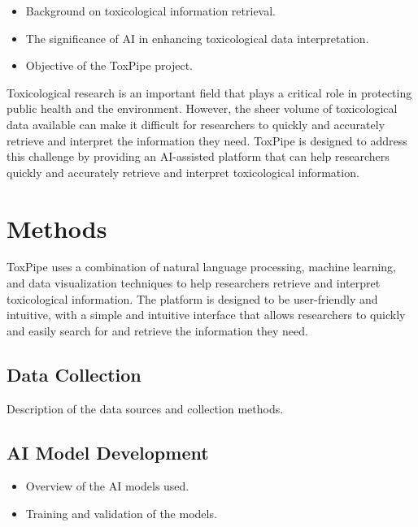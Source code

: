 \documentclass[
  super,
  preprint,
  5p,
  twocolumn]{elsarticle}
\providecommand{\tightlist}{%
  \setlength{\itemsep}{0pt}\setlength{\parskip}{0pt}}\usepackage{longtable,booktabs,array}
\begin{document}
\begin{itemize}
\tightlist
\item
  Background on toxicological information retrieval.
\item
  The significance of AI in enhancing toxicological data interpretation.
\item
  Objective of the ToxPipe project.
\end{itemize}

Toxicological research is an important field that plays a critical role
in protecting public health and the environment. However, the sheer
volume of toxicological data available can make it difficult for
researchers to quickly and accurately retrieve and interpret the
information they need. ToxPipe is designed to address this challenge by
providing an AI-assisted platform that can help researchers quickly and
accurately retrieve and interpret toxicological information.

\hypertarget{methods}{%
\section{Methods}\label{methods}}

ToxPipe uses a combination of natural language processing, machine
learning, and data visualization techniques to help researchers retrieve
and interpret toxicological information. The platform is designed to be
user-friendly and intuitive, with a simple and intuitive interface that
allows researchers to quickly and easily search for and retrieve the
information they need.

\hypertarget{data-collection}{%
\subsection{Data Collection}\label{data-collection}}

Description of the data sources and collection methods.

\hypertarget{ai-model-development}{%
\subsection{AI Model Development}\label{ai-model-development}}

\begin{itemize}
\tightlist
\item
  Overview of the AI models used.
\item
  Training and validation of the models.
\end{itemize}
\end{document}
